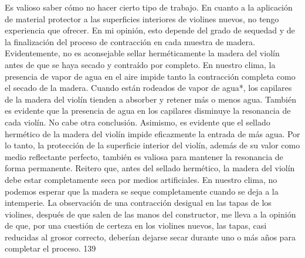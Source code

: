 Es valioso saber cómo no hacer cierto tipo de trabajo.
En cuanto a la aplicación de material protector a las superficies interiores de violines nuevos, no tengo experiencia que ofrecer. En mi opinión, esto depende del grado de sequedad y de la finalización del proceso de contracción en cada muestra de madera. Evidentemente, no es aconsejable sellar herméticamente la madera del violín antes de que se haya secado y contraído por completo. En nuestro clima, la presencia de vapor de agua en el aire impide tanto la contracción completa como el secado de la madera. Cuando están rodeados de vapor de agua*, los capilares de la madera del violín tienden a absorber y retener más o menos agua. También es evidente que la presencia de agua en los capilares disminuye la resonancia de cada violín. No cabe otra conclusión. Asimismo, es evidente que el sellado hermético de la madera del violín impide eficazmente la entrada de más agua. Por lo tanto, la protección de la superficie interior del violín, además de su valor como medio reflectante perfecto, también es valiosa para mantener la resonancia de forma permanente. Reitero que, antes del sellado hermético, la madera del violín debe estar completamente seca por medios artificiales. En nuestro clima, no podemos esperar que la madera se seque completamente cuando se deja a la intemperie. La observación de una contracción desigual en las tapas de los violines, después de que salen de las manos del constructor, me lleva a la opinión de que, por una cuestión de certeza en los violines nuevos, las tapas, casi reducidas al grosor correcto, deberían dejarse secar durante uno o más años para completar el proceso.
139

